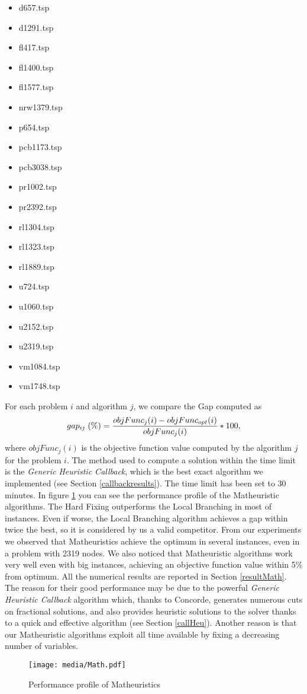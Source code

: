 \begin{multicols}{3}
    \begin{itemize}
        \item d657.tsp
        \item d1291.tsp
        \item fl417.tsp
        \item fl1400.tsp
        \item fl1577.tsp
        \item nrw1379.tsp
        \item p654.tsp
        \item pcb1173.tsp
        \item pcb3038.tsp
        \item pr1002.tsp
        \item pr2392.tsp
        \item rl1304.tsp
        \item rl1323.tsp 
        \item rl1889.tsp
        \item u724.tsp
        \item u1060.tsp
        \item u2152.tsp
        \item u2319.tsp
        \item vm1084.tsp
        \item vm1748.tsp
    \end{itemize}
    \end{multicols}
    
\noindent
For each problem $i$ and algorithm $j$, we compare the Gap computed as
\begin{equation}
	gap_{ij} \; (\%) = { objFunc_j(i) - objFunc_{opt}(i) \over objFunc_j(i) } * 100,
\end{equation}
\noindent
where $objFunc_j(i)$ is the objective function value computed by the algorithm $j$ for the problem $i$.
The method used to compute a solution within the time limit is the \textit{Generic Heuristic Callback}, which is the best exact algorithm we implemented (see Section \ref{callbackresults}). The time limit has been set to 30 minutes.
In figure \ref{fig:Math} you can see the performance profile of the Matheuristic algorithms. The Hard Fixing outperforms the Local Branching in most of instances. Even if worse, the Local Branching algorithm achieves a gap within twice the best, so it is considered by us a valid competitor. 
From our experiments we observed that Matheuristics achieve the optimum in several instances, even in a problem with 2319 nodes. We also noticed that Matheuristic algorithms work very well even with big instances, achieving an objective function value within 5\% from optimum. All the numerical results are reported in Section \ref{resultMath}.  
The reason for their good performance may be due to the powerful \textit{Generic Heuristic Callback} algorithm which, thanks to Concorde, generates numerous cuts on fractional solutions, and also provides heuristic solutions to the solver thanks to a quick and effective algorithm (see Section \ref{callHeu}). Another reason is that our Matheuristic algorithms exploit all time available by fixing a decreasing number of variables.

\begin{figure}[H]
\centering
	\texttt{[image: media/Math.pdf]} \\
	\caption{Performance profile of Matheuristics}
	\label{fig:Math}
\end{figure}

